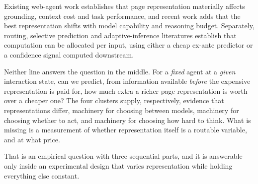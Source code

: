 Existing web-agent work establishes that page representation materially affects
grounding, context cost and task performance, and recent work adds that the best
representation shifts with model capability and reasoning budget. Separately,
routing, selective prediction and adaptive-inference literatures establish that
computation can be allocated per input, using either a cheap ex-ante predictor
or a confidence signal computed downstream.

Neither line answers the question in the middle. For a \emph{fixed} agent at a
\emph{given} interaction state, can we predict, from information available
\emph{before} the expensive representation is paid for, how much extra a
richer page representation is worth over a cheaper one? The four clusters
supply, respectively, evidence that representations differ, machinery for
choosing between models, machinery for choosing whether to act, and machinery
for choosing how hard to think. What is missing is a measurement of whether
representation itself is a routable variable, and at what price.

That is an empirical question with three sequential parts, and it is answerable
only inside an experimental design that varies representation while holding
everything else constant.

